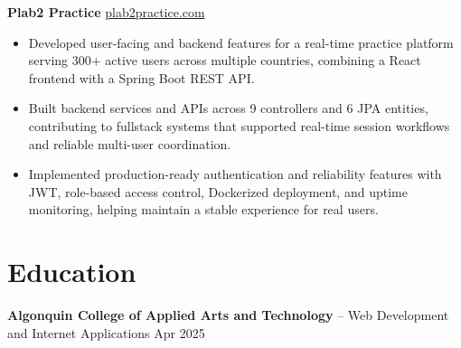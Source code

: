 \documentclass[11pt]{article}       %
\begin{document}
\textbf{Plab2 Practice} \hfill \href{https://plab2practice.com}{plab2practice.com} \\
\vspace{-9pt}
\begin{itemize}
  \item Developed user-facing and backend features for a real-time practice platform serving 300+ active users across multiple countries, combining a React frontend with a Spring Boot REST API.
  \item Built backend services and APIs across 9 controllers and 6 JPA entities, contributing to fullstack systems that supported real-time session workflows and reliable multi-user coordination.
  \item Implemented production-ready authentication and reliability features with JWT, role-based access control, Dockerized deployment, and uptime monitoring, helping maintain a stable experience for real users.
\end{itemize}





\section*{Education}
\textbf{Algonquin College of Applied Arts and Technology} -- Web Development and Internet Applications
\hfill Apr 2025 \\
\end{document}

